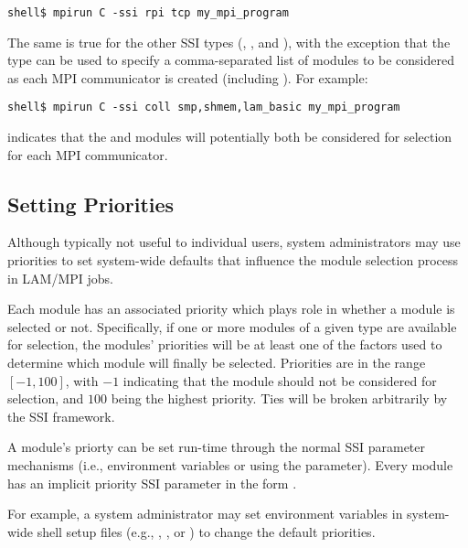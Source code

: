 \lstset{style=lam-cmdline}
\begin{lstlisting}
shell$ mpirun C -ssi rpi tcp my_mpi_program
\end{lstlisting}

The same is true for the other SSI types (, , and
), with the exception that the  type can be used
to specify a comma-separated list of modules to be considered as each
MPI communicator is created (including
).  For example:

\lstset{style=lam-cmdline}
\begin{lstlisting}
shell$ mpirun C -ssi coll smp,shmem,lam_basic my_mpi_program
\end{lstlisting}

\noindent indicates that the  and 
modules will potentially both be considered for selection for each MPI
communicator.


\subsection{Setting Priorities}

Although typically not useful to individual users, system
administrators may use priorities to set system-wide defaults that
influence the module selection process in LAM/MPI jobs.

Each module has an associated priority which plays role in whether a
module is selected or not.  Specifically, if one or more modules of a
given type are available for selection, the modules' priorities will
be at least one of the factors used to determine which module will
finally be selected.  Priorities are in the range $[-1, 100]$, with
$-1$ indicating that the module should not be considered for
selection, and $100$ being the highest priority.  Ties will be broken
arbitrarily by the SSI framework.

A module's priorty can be set run-time through the normal SSI
parameter mechanisms (i.e., environment variables or using the
 parameter).  Every module has an implicit priority SSI
parameter in the form .

For example, a system administrator may set environment variables in
system-wide shell setup files (e.g., ,
, or ) to change the default
priorities.  

